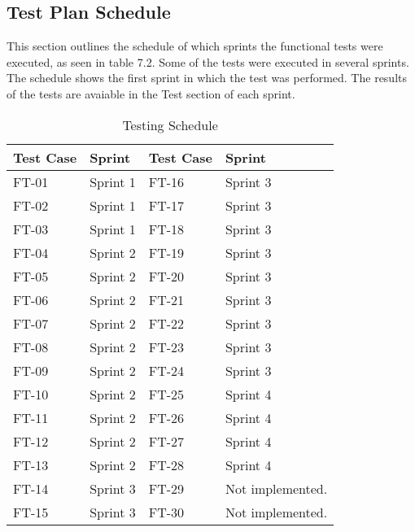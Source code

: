 \subsection*{Test Plan Schedule}

This section outlines the schedule of which sprints the functional tests were executed, as seen in table 7.2. Some of the tests were executed in several sprints. The schedule shows the first sprint in which the test was performed. The results of the tests are avaiable in the Test section of each sprint.


\begin{table}[h]
\centering
\begin{tabular}{| l | l || l | l |}
	\rowcolor{lightgray}
	\hline
	{\bf Test Case} & {\bf Sprint} & {\bf Test Case} & {\bf Sprint} \\ \hline
	FT-01 & Sprint 1 & FT-16 & Sprint 3 \\ \hline
	FT-02 & Sprint 1 & FT-17 & Sprint 3 \\ \hline
	FT-03 & Sprint 1 & FT-18 & Sprint 3 \\ \hline
	FT-04 & Sprint 2 & FT-19 & Sprint 3	\\ \hline
	FT-05 & Sprint 2 & FT-20 & Sprint 3 \\ \hline
	FT-06 & Sprint 2 & FT-21 & Sprint 3 \\ \hline
	FT-07 & Sprint 2 & FT-22 & Sprint 3	\\ \hline
	FT-08 & Sprint 2 & FT-23 & Sprint 3 \\ \hline
	FT-09 & Sprint 2 & FT-24 & Sprint 3 \\ \hline
	FT-10 & Sprint 2 & FT-25 & Sprint 4 \\ \hline
	FT-11 & Sprint 2 & FT-26 & Sprint 4 \\ \hline
	FT-12 & Sprint 2 & FT-27 & Sprint 4 \\ \hline 
	FT-13 & Sprint 2 & FT-28 & Sprint 4 \\ \hline
	FT-14 & Sprint 3 & FT-29 & Not implemented. \\ \hline
	FT-15 & Sprint 3 & FT-30 & Not implemented. \\ \hline
\end{tabular}
\caption{Testing Schedule}
\end{table}